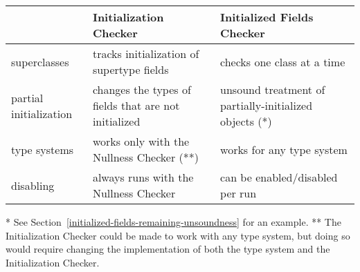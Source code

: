 \noindent
\begin{small}
\begin{tabular}{| l | l | l |}
 \hline
 & Initialization Checker & Initialized Fields Checker
 \\ \hline
 superclasses
 & tracks initialization of supertype fields
 & checks one class at a time
 \\
 partial initialization
 & changes the types of fields that are not initialized
 & unsound treatment of partially-initialized objects (*)
 \\
 type systems
 & works only with the Nullness Checker (**)
 & works for any type system
 \\
 disabling
 & always runs with the Nullness Checker
 & can be enabled/disabled per run
 \\
 \hline
\end{tabular}

\noindent
* See Section~\ref{initialized-fields-remaining-unsoundness} for an example.
\newline
** The Initialization Checker could be made to work with any type system, but
doing so would require changing the implementation of both the type system and
the Initialization Checker.
\end{small}


